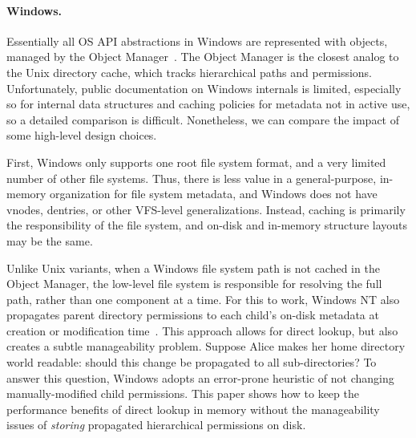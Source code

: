 \paragraph{Windows.}  Essentially all OS API abstractions in Windows are represented 
with objects, managed by the Object Manager~\cite{windowsinternals}.
The Object Manager is the closest analog to the Unix directory cache,
which tracks hierarchical paths and permissions.
Unfortunately, public documentation on Windows internals
is limited, especially so for internal data structures 
and caching policies for metadata not in active use,
so a detailed comparison is difficult.  Nonetheless, we can compare the impact of some high-level design choices.

First, Windows only supports one root file system format, and a very limited 
number of other file systems.
Thus, there is less value in a general-purpose, in-memory organization for file system metadata,
and Windows does not have vnodes, dentries, or other VFS-level generalizations.
Instead, caching is primarily the responsibility of the file system,
and on-disk and in-memory structure layouts may be the same.

Unlike Unix variants, when a Windows file system path is not cached in the Object Manager,
the low-level file system is responsible for resolving the full path, rather than one component 
at a time.
For this to work, Windows NT
also propagates parent directory permissions
to each child's on-disk metadata at creation or modification time~\cite{swift01winnt}.
This approach allows for direct lookup, but also creates a subtle manageability problem.
Suppose Alice makes her home directory 
world readable: should this change be propagated to all sub-directories?
To answer this question, Windows adopts an error-prone heuristic 
of not changing manually-modified child permissions.
This paper shows how to keep the performance benefits of direct lookup in memory
without the manageability issues of {\em storing} propagated hierarchical permissions on disk.


